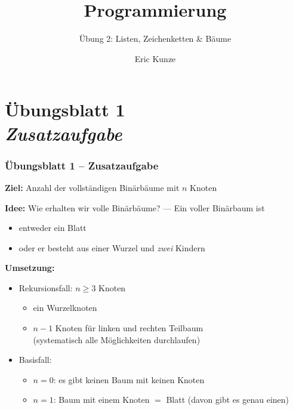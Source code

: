 \documentclass{beamer}
\begin{document}
	
	\title{Programmierung}
	\subtitle{Übung 2: Listen, Zeichenketten \& Bäume}
	\author{Eric Kunze}
	\date{}
	
	\maketitle



\section{Übungsblatt 1 \\ \textit{\normalsize Zusatzaufgabe}}

\begin{frame} \frametitle{Übungsblatt 1 -- Zusatzaufgabe}
	\footnotesize
	\textbf{Ziel:} Anzahl der vollständigen Binärbäume mit $n$ Knoten
	
	\textbf{Idee:} Wie erhalten wir volle Binärbäume? --- Ein voller Binärbaum ist
	\begin{itemize}
		\item entweder ein Blatt
		\item oder er besteht aus einer Wurzel und \textit{zwei} Kindern 
	\end{itemize}

	\textbf{Umsetzung:}  
	\begin{itemize}
		\item Rekursionsfall: $n \ge 3$ Knoten 
		\begin{itemize}
			\item ein Wurzelknoten
			\item $n-1$ Knoten für linken und rechten Teilbaum \\ (systematisch alle Möglichkeiten durchlaufen)
		\end{itemize}
		\item Basisfall: 
		\begin{itemize}
			\item $n = 0$: es gibt keinen Baum mit keinen Knoten
			\item $n = 1$: Baum mit einem Knoten $=$ Blatt (davon gibt es genau einen)
		\end{itemize}
	\end{itemize}
\end{frame}
\end{document}
